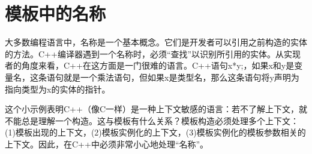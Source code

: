 \chapter{模板中的名称}
大多数编程语言中，名称是一个基本概念。它们是开发者可以引用之前构造的实体的方法。C++编译器遇到一个名称时，必须“查找”以识别所引用的实体。从实现者的角度来看，C++在这方面是一门很难的语言。C++语句x*y;，如果x和y是变量名，这条语句就是一个乘法语句，但如果x是类型名，那么这条语句将y声明为指向类型为x的实体的指针。

这个小示例表明C++（像C一样）是一种上下文敏感的语言：若不了解上下文，就不能总是理解一个构造。这与模板有什么关系？模板构造必须处理多个上下文：(1)模板出现的上下文，(2)模板实例化的上下文，(3)模板实例化的模板参数相关的上下文。因此，在C++中必须非常小心地处理“名称”。




